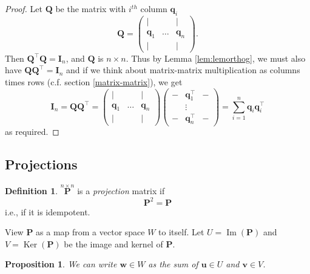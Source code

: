 \documentclass[
]{book}
\newtheorem{proposition}{Proposition}[chapter]
\theoremstyle{definition}
\newtheorem{definition}{Definition}[chapter]
\theoremstyle{definition}
\theoremstyle{definition}
\theoremstyle{definition}
\theoremstyle{remark}
\begin{document}
\begin{proof}
Let \(\mathbf Q\) be the matrix with \(i^{th}\) column \(\mathbf q_i\)
\[\mathbf Q=\left(
    \begin{array}{ccc}
    | &&|\\
    \mathbf q_1& \ldots& \mathbf q_n\\
    | &&|
      \end{array}\right).\]
Then \(\mathbf Q^\top \mathbf Q=\mathbf I_n\), and \(\mathbf Q\) is \(n\times n\). Thus by Lemma \ref{lem:lemorthog}, we must also have \(\mathbf Q\mathbf Q^\top=\mathbf I_n\) and if we think about matrix-matrix multiplication as columns times rows (c.f. section \ref{matrix-matrix}), we get
\[\mathbf I_n=\mathbf Q\mathbf Q^\top=\left(
    \begin{array}{ccc}
    | &&|\\
    \mathbf q_1& \ldots& \mathbf q_n\\
    | &&|
      \end{array}\right) \left(
    \begin{array}{ccc}
    - &\mathbf q_1^\top&-\\
    & \vdots& \\
    - &\mathbf q_n^\top&-
      \end{array}\right) = \sum_{i=1}^n \mathbf q_i \mathbf q_i^\top\]
as required.
\end{proof}

\hypertarget{projection-matrix}{%
\subsection{Projections}\label{projection-matrix}}

\begin{definition}
\protect\hypertarget{def:projection}{}\label{def:projection}\(\stackrel{n \times n}{\mathbf P}\) is a \emph{projection}
matrix if
\[\mathbf P^2 =\mathbf P\]
i.e., if it is idempotent.
\end{definition}

View \(\mathbf P\) as a map from a vector space \(W\) to itself. Let \(U=\operatorname{Im}(\mathbf P)\) and \(V=\operatorname{Ker}(\mathbf P)\) be the image and kernel of \(\mathbf P\).

\begin{proposition}
\protect\hypertarget{prp:projec1}{}\label{prp:projec1}We can write \(\mathbf w\in W\) as the sum of \(\mathbf u\in U\) and \(\mathbf v\in V\).
\end{proposition}
\end{document}
